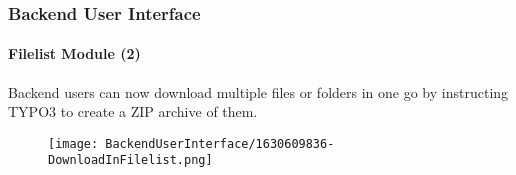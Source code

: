 %

\begin{frame}[fragile]
	\frametitle{Backend User Interface}
	\framesubtitle{Filelist Module (2)}

	Backend users can now download multiple files or folders in one go by
	instructing TYPO3 to create a ZIP archive of them.

	\begin{figure}
		\texttt{[image: BackendUserInterface/1630609836-DownloadInFilelist.png]}
	\end{figure}

\end{frame}

